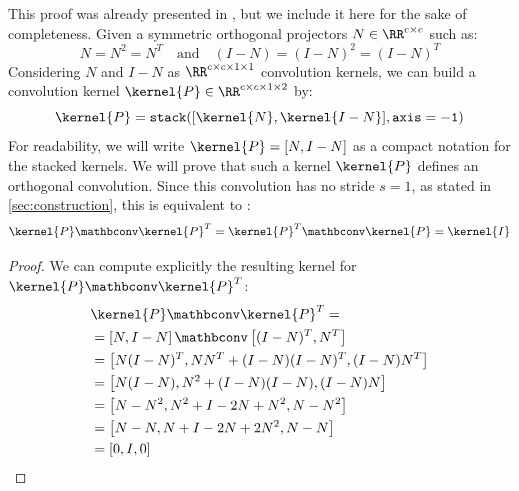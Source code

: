         This proof was already presented in \cite{li_preventing_2019}, but we include it here for the sake of completeness. %
        Given a symmetric orthogonal projectors $N\in\RR^{c\times c}$  such as:
        \[
            N = N^2 = N^T \quad \text{and} \quad (I - N) = (I - N)^2 = (I - N)^T
        \]
        Considering $N$ and $I-N$ as $\RR^{c\times c\times 1\times 1}$ convolution kernels, 
        we can build a  convolution kernel  $\kernel{P}\in\RR^{c\times c\times 1\times 2}$  by: 
        \[
        \kernel{P} = \mathtt{stack(}[\kernel{N}, \kernel{I - N}]\mathtt{, axis=-1)}        
        \]
        For readability, we will write $\kernel{P} = \left[ N , I-N \right]$ as a compact notation for the stacked kernels. We will prove that such a kernel $\kernel{P}$ defines an  orthogonal convolution. Since this convolution has no stride $s=1$, as stated in  \cref{sec:construction}, this is equivalent to :
        \[
        \kernel{P} \mathbconv \kernel{P}^T = \kernel{P}^T \mathbconv \kernel{P} = \kernel{I} 
        \]

    \begin{proof}

        We can  compute explicitly the resulting kernel for $\kernel{P} \mathbconv \kernel{P}^T$:
        \begin{align*}
            & \kernel{P} \mathbconv \kernel{P}^T =\\
            & = \left[ N , I-N \right] \mathbconv \left[ (I-N)^T , N^T \right] \\
            & = \left[ N(I-N)^T , NN^T + (I-N)(I-N)^T, (I-N)N^T  \right] \\
            & = \left[ N(I-N) , N^2 + (I-N)(I-N), (I-N)N  \right] \\
            & = \left[ N-N^2 , N^2 + I - 2N + N^2, N-N^2  \right] \\
            & = \left[ N-N , N + I - 2N + 2N^2, N-N  \right] \\
            & = \left[ 0, I, 0  \right] \\
        \end{align*}
    \end{proof}

